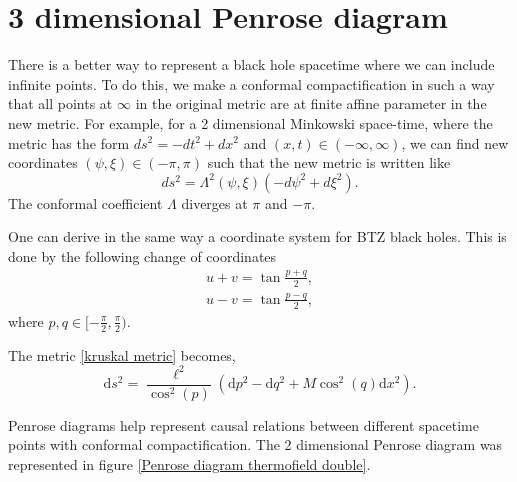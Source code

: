 \section{3 dimensional Penrose diagram}

There is a better way to represent a black hole spacetime where we can include infinite points. To do this, we make a conformal compactification in such a way that all points at $\infty$ in the original metric are at finite affine parameter in the new metric. For example, for a  2 dimensional Minkowski space-time, where the metric has the form $ds^2= -dt^2 + dx^2$ and $(x,t)\in(-\infty,\infty)$, we can find new coordinates $\left(\psi,\xi\right)\in\left(-\pi,\pi\right)$ such that the new metric is written like 
\begin{equation}
    ds^2 = \Lambda^2\left(\psi,\xi\right)\left(-d\psi^2+d\xi^2\right).
\end{equation}
The conformal coefficient $\Lambda$ diverges at $\pi$ and $-\pi$.

One can derive in the same way a coordinate system for BTZ black holes. This is done by the following change of coordinates
\begin{subequations}
\label{Penrose coord}
\begin{align}
     u + v = \tan\frac{p+q}{2},\label{Perose +}\\
     u - v = \tan\frac{p-q}{2},\label{Penrose -}
\end{align}
\end{subequations}
where $p,q\in[-\frac{\pi}{2},\frac{\pi}{2})$.

The metric \ref{kruskal metric} becomes,
\begin{equation}\label{metricdial Penrose}
    \text{d}s^2=\frac{\ell^2}{\cos^2(p)}\left(\text{d}p^2-\text{d}q^2+M\cos^2(q)\text{d}x^2\right).
\end{equation}


Penrose diagrams help represent causal relations between different spacetime points with conformal compactification. The 2 dimensional Penrose diagram was represented in figure \ref{Penrose diagram thermofield double}.

